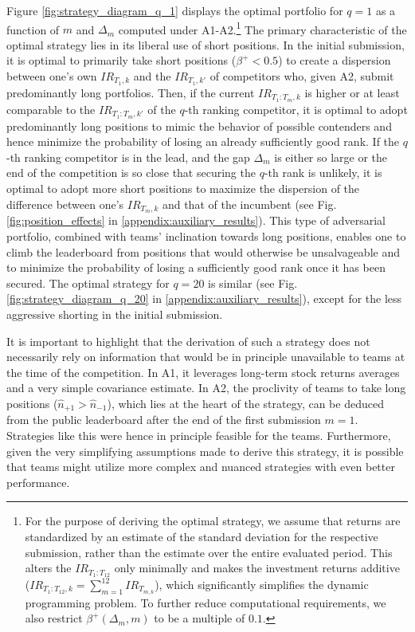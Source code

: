 \documentclass[3p,times,twocolumn]{elsarticle}
\begin{document}
Figure \ref{fig:strategy_diagram_q_1} displays the optimal portfolio for $q=1$ as a function of $m$ and $\Delta_{m}$ computed under A1-A2.\footnote{
    For the purpose of deriving the optimal strategy, we assume that returns are standardized by an estimate of the standard deviation for the respective submission, rather than the estimate over the entire evaluated period.
    This alters the $IR_{T_{1}:T_{12}}$ only minimally and makes the investment returns additive ($IR_{T_{1}:T_{12},k}= \sum_{m=1}^{12}IR_{T_{m,k}}$), which significantly simplifies the dynamic programming problem.
    To further reduce computational requirements, we also restrict $\beta^{+}(\Delta_{m},m)$ to be a multiple of $0.1$.
}
The primary characteristic of the optimal strategy lies in its liberal use of short positions.
In the initial submission, it is optimal to primarily take short positions ($\beta^{+}<0.5$) to create a dispersion between one's own $IR_{T_{1},k}$ and the $IR_{T_{1},k'}$ of competitors who, given A2, submit predominantly long portfolios.
Then, if the current $IR_{T_{1}:T_{m},k}$ is higher or at least comparable to the $IR_{T_{1}:T_{m},k'}$ of the $q$-th ranking competitor, it is optimal to adopt predominantly long positions to mimic the behavior of possible contenders and hence minimize the probability of losing an already sufficiently good rank.
If the $q$-th ranking competitor is in the lead, and the gap $\Delta_{m}$ is either so large or the end of the competition is so close that securing the $q$-th rank is unlikely, it is optimal to adopt more short positions to maximize the dispersion of the difference between one's $IR_{T_{m},k}$ and that of the incumbent (see Fig. \ref{fig:position_effects} in \ref{appendix:auxiliary_results}).
This type of adversarial portfolio, combined with teams' inclination towards long positions, enables one to climb the leaderboard from positions that would otherwise be unsalvageable and to minimize the probability of losing a sufficiently good rank once it has been secured.
The optimal strategy for $q=20$ is similar (see Fig. \ref{fig:strategy_diagram_q_20} in \ref{appendix:auxiliary_results}), except for the less aggressive shorting in the initial submission.

It is important to highlight that the derivation of such a strategy does not necessarily rely on information that would be in principle unavailable to teams at the time of the competition.
In A1, it leverages long-term stock returns averages and a very simple covariance estimate.
In A2, the proclivity of teams to take long positions ($\hat{n}_{+1}>\hat{n}_{-1}$), which lies at the heart of the strategy, can be deduced from the public leaderboard after the end of the first submission $m=1$.
Strategies like this were hence in principle feasible for the teams.
Furthermore, given the very simplifying assumptions made to derive this strategy, it is possible that teams might utilize more complex and nuanced strategies with even better performance.
\end{document}

